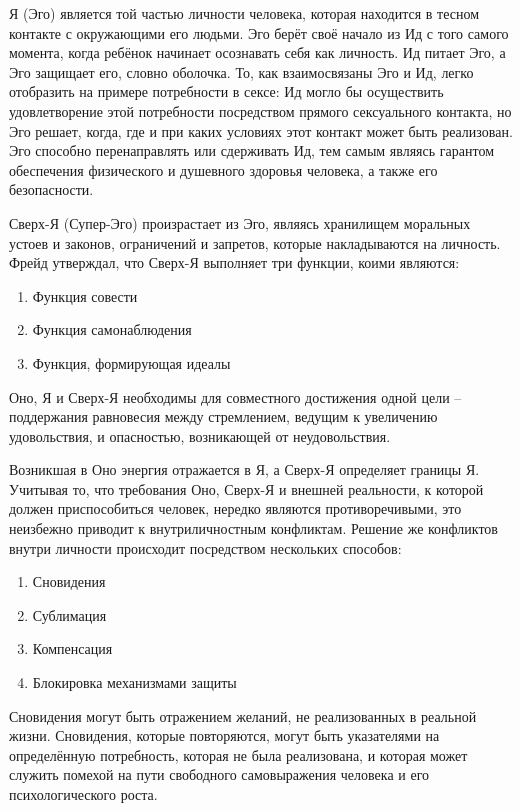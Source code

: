 Я (Эго) является той частью личности человека, которая находится в тесном контакте с окружающими его людьми. Эго берёт своё начало из Ид с того самого момента, когда ребёнок начинает осознавать себя как личность. Ид питает Эго, а Эго защищает его, словно оболочка. То, как взаимосвязаны Эго и Ид, легко отобразить на примере потребности в сексе: Ид могло бы осуществить удовлетворение этой потребности посредством прямого сексуального контакта, но Эго решает, когда, где и при каких условиях этот контакт может быть реализован. Эго способно перенаправлять или сдерживать Ид, тем самым являясь гарантом обеспечения физического и душевного здоровья человека, а также его безопасности.

Сверх-Я (Супер-Эго) произрастает из Эго, являясь хранилищем моральных устоев и законов, ограничений и запретов, которые накладываются на личность. Фрейд утверждал, что Сверх-Я выполняет три функции, коими являются:
\begin{enumerate}
    \item Функция совести
    \item Функция самонаблюдения
    \item Функция, формирующая идеалы
\end{enumerate}

Оно, Я и Сверх-Я необходимы для совместного достижения одной цели – поддержания равновесия между стремлением, ведущим к увеличению удовольствия, и опасностью, возникающей от неудовольствия.

Возникшая в Оно энергия отражается в Я, а Сверх-Я определяет границы Я. Учитывая то, что требования Оно, Сверх-Я и внешней реальности, к которой должен приспособиться человек, нередко являются противоречивыми, это неизбежно приводит к внутриличностным конфликтам. Решение же конфликтов внутри личности происходит посредством нескольких способов:
\begin{enumerate}
    \item Сновидения
    \item Сублимация
    \item Компенсация
    \item Блокировка механизмами защиты
\end{enumerate}

Сновидения могут быть отражением желаний, не реализованных в реальной жизни. Сновидения, которые повторяются, могут быть указателями на определённую потребность, которая не была реализована, и которая может служить помехой на пути свободного самовыражения человека и его психологического роста.

